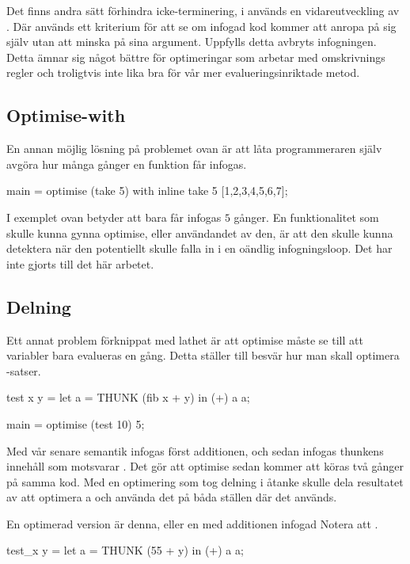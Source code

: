 \documentclass[Rapport]{subfiles}
\begin{document}
Det finns andra sätt förhindra icke-terminering, i \cite{mitchell2007supercompiler} 
används en vidareutveckling av \cite{home-emb}. Där används ett kriterium för att se om infogad kod kommer att anropa på sig själv utan att minska på sina argument. Uppfylls detta avbryts infogningen. Detta ämnar sig något bättre för optimeringar som arbetar med omskrivnings regler och troligtvis inte lika bra för vår mer evalueringsinriktade metod.



\subsection{Optimise-with}
En annan möjlig lösning på problemet ovan är att låta programmeraren själv avgöra hur
många gånger en funktion får infogas.

\begin{codeEx}
main = optimise (take 5) with { inline take 5 } [1,2,3,4,5,6,7];
\end{codeEx}

I exemplet ovan betyder  att  bara får infogas $5$ gånger.
En funktionalitet som skulle kunna gynna optimise, eller användandet av den,
är att den skulle kunna detektera när den potentiellt skulle falla in i en
oändlig infogningsloop. Det har inte gjorts till det här arbetet.

\subsection{Delning}
Ett annat problem förknippat med lathet är att optimise måste se till att variabler bara 
evalueras en gång. Detta ställer till besvär hur man skall optimera -satser.

\begin{codeEx}
test x y = let
    { a = THUNK (fib x + y)
    } in (+) a a;

main = optimise (test 10) 5;
\end{codeEx}

Med vår senare semantik infogas först additionen, och sedan infogas thunkens innehåll
som motsvarar . Det gör att optimise sedan kommer att
köras två gånger på samma kod. Med en optimering som tog delning i åtanke 
skulle dela resultatet av att optimera a och använda det på båda ställen där det används.

En optimerad version är denna, eller en med additionen infogad Notera att .

\begin{codeEx}
test_x y = let
    { a = THUNK (55 + y)
    } in (+) a a;
\end{codeEx}
\end{document}
